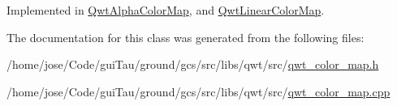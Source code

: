 Implemented in \hyperlink{class_qwt_alpha_color_map_a2f0ce2bdaecf7e74b635b8433ed733d5}{Qwt\-Alpha\-Color\-Map}, and \hyperlink{class_qwt_linear_color_map_ac031babccc90d8c857c707d0841ba1eb}{Qwt\-Linear\-Color\-Map}.



The documentation for this class was generated from the following files\-:\begin{DoxyCompactItemize}
\item 
/home/jose/\-Code/gui\-Tau/ground/gcs/src/libs/qwt/src/\hyperlink{qwt__color__map_8h}{qwt\-\_\-color\-\_\-map.\-h}\item 
/home/jose/\-Code/gui\-Tau/ground/gcs/src/libs/qwt/src/\hyperlink{qwt__color__map_8cpp}{qwt\-\_\-color\-\_\-map.\-cpp}\end{DoxyCompactItemize}
